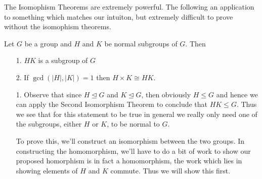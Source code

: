     
    The Isomophism Theorems are extremely powerful. The following
    an application to something which matches our intuiton, but
    extremely difficult to prove without the isomophism theorems.    
    \begin{thm}\label{product_theorem}
        Let $G$ be a group and $H$ and $K$ be normal subgroups of $G$.
        Then 
        \begin{itemize}
            \item[1.] $HK$ is a subgroup of $G$ 
            \item[2.] If $\gcd(|H|, |K|) = 1$ then $H \times K \cong
            HK$. 
        \end{itemize}
    \end{thm}

    \begin{prf}
        \begin{itemize}
            \item[1.] Observe that since $H \unlhd G$ and $K \unlhd G$, then obviously 
            $H \le G$ and hence we can apply the Second Isomorphism Theorem to conclude 
            that $HK \le G$. Thus we see that for this statement to be true in general 
            we really only need one of the subgroups, either $H$ or $K$, to be normal 
            to $G$.

            \textcolor{NavyBlue}{To prove this, we'll construct an
            isomorphism between the two groups. In constructing the
            homomorphism, we'll have to do a bit of work to show our
            proposed homorphism is in fact a homomorphism, the work
            which lies in showing elements of $H$ and $K$ commute.
            Thus we will show this first.}


\end{itemize}
\end{prf}
